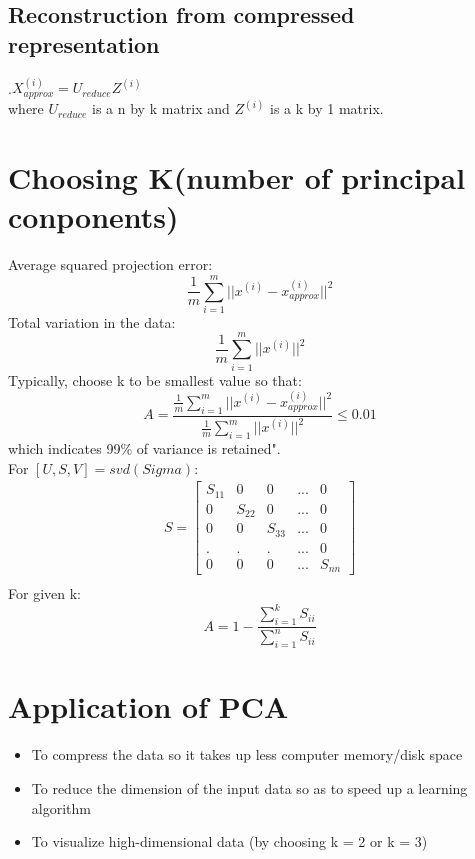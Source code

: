 \documentclass[11pt]{article}
\begin{document}
		\subsection{Reconstruction from compressed representation}
			.\qquad $X_{approx}^{(i)} = U_{reduce}Z^{(i)}$ \\
			where $U_{reduce}$ is a n by k matrix and $Z^{(i)}$ is a k by 1 matrix.
	\section{Choosing K(number of principal conponents)}
		Average squared projection error:
		$$
		\frac{1}{m}\sum_{i=1}^{m}|| x^{(i)} - x^{(i)}_{approx}|| ^ 2
		$$
		Total variation in the data:
		$$
		\frac{1}{m}\sum_{i=1}^{m}|| x^{(i)} || ^ 2
		$$
		Typically, choose k to be smallest value so that:
		$$
		A = \frac{\frac{1}{m}\sum_{i=1}^{m}|| x^{(i)} - x^{(i)}_{approx} ||^2}{\frac{1}{m}\sum_{i=1}^{m}|| x^{(i)} ||^ 2} \leq 0.01
		$$
		which indicates 99\% of variance is retained". \\
		
		For $[U, S, V] = svd(Sigma)$:
		$$
		\begin{aligned}
		S = 
		\left[
		\begin{matrix}
			S_{11} & 0 & 0 & ... & 0\\
			0 & S_{22} & 0 & ... & 0\\
			0 & 0 & S_{33} & ... & 0\\
			. & . & . & ... & 0 \\
			0 & 0 & 0 & ... & S_{nn}  
		\end{matrix}
		\right] \\
		\end{aligned}
		$$
		For given k:
		$$
		A = 1 - \frac{\sum_{i=1}^{k}S_{ii}}{\sum_{i=1}^{n}S_{ii}}
		$$
	\section{Application of PCA}
	\begin{itemize}
		\item To compress the data so it takes up less computer memory/disk space
		\item To reduce the dimension of the input data so as to speed up a learning algorithm
		\item To visualize high-dimensional data (by choosing k = 2 or k = 3)
	\end{itemize}
\end{document}
